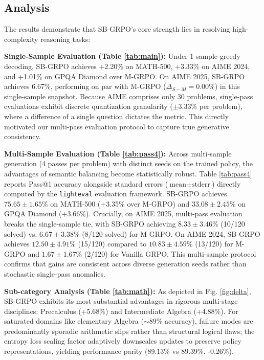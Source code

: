 \subsection{Analysis}
The results demonstrate that SB-GRPO's core strength lies in resolving high-complexity reasoning tasks:

\textbf{Single-Sample Evaluation (Table \ref{tab:main}):} Under 1-sample greedy decoding, SB-GRPO achieves +2.20\% on MATH-500, +3.33\% on AIME 2024, and +1.01\% on GPQA Diamond over M-GRPO. On AIME 2025, SB-GRPO achieves 6.67\%, performing on par with M-GRPO ($\Delta_{S-M} = 0.00\%$) in this single-sample snapshot. Because AIME comprises only 30 problems, single-pass evaluations exhibit discrete quantization granularity ($\pm 3.33\%$ per problem), where a difference of a single question dictates the metric. This directly motivated our multi-pass evaluation protocol to capture true generative consistency.

\textbf{Multi-Sample Evaluation (Table \ref{tab:pass4}):} Across multi-sample generation (4 passes per problem) with distinct seeds on the trained policy, the advantages of semantic balancing become statistically robust. Table \ref{tab:pass4} reports Pass@1 accuracy alongside standard errors ($\text{mean} \pm \text{stderr}$) directly computed by the \texttt{lighteval} evaluation framework. SB-GRPO achieves $75.65 \pm 1.65\%$ on MATH-500 (+3.35\% over M-GRPO) and $33.08 \pm 2.45\%$ on GPQA Diamond (+3.66\%). Crucially, on AIME 2025, multi-pass evaluation breaks the single-sample tie, with SB-GRPO achieving $8.33 \pm 3.46\%$ (10/120 solved) vs. $6.67 \pm 3.38\%$ (8/120 solved) for M-GRPO. On AIME 2024, SB-GRPO achieves $12.50 \pm 4.91\%$ (15/120) compared to $10.83 \pm 4.59\%$ (13/120) for M-GRPO and $1.67 \pm 1.67\%$ (2/120) for Vanilla GRPO. This multi-sample protocol confirms that gains are consistent across diverse generation seeds rather than stochastic single-pass anomalies.

\textbf{Sub-category Analysis (Table \ref{tab:math}):} As depicted in Fig. \ref{fig:delta}, SB-GRPO exhibits its most substantial advantages in rigorous multi-stage disciplines: Precalculus (+5.68\%) and Intermediate Algebra (+4.88\%). For saturated domains like elementary Algebra ($\sim 89\%$ accuracy), failure modes are predominantly sporadic arithmetic slips rather than structural logical flaws; the entropy loss scaling factor adaptively downscales updates to preserve policy representations, yielding performance parity (89.13\% vs 89.39\%, -0.26\%).


